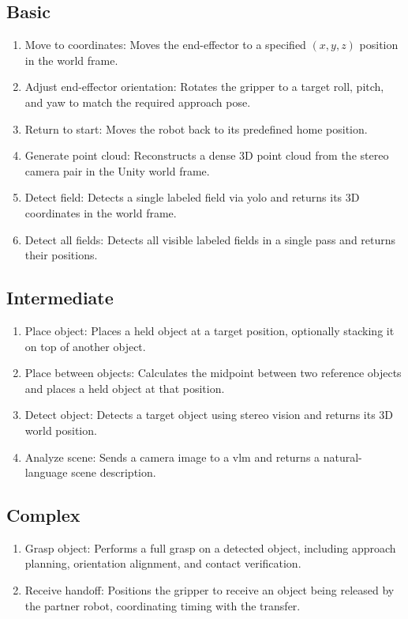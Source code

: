 \subsection{Basic}
\begin{enumerate}
	\item Move to coordinates: Moves the end-effector to a specified $(x, y, z)$ position in the world frame.
	\item Adjust end-effector orientation: Rotates the gripper to a target roll, pitch, and yaw to match the required approach pose.
	\item Return to start: Moves the robot back to its predefined home position.
	\item Generate point cloud: Reconstructs a dense 3D point cloud from the stereo camera pair in the Unity world frame.
	\item Detect field: Detects a single labeled field via \gls{yolo} and returns its 3D coordinates in the world frame.
	\item Detect all fields: Detects all visible labeled fields in a single pass and returns their positions.
\end{enumerate}

\subsection{Intermediate}
\begin{enumerate}
	\item Place object: Places a held object at a target position, optionally stacking it on top of another object.
	\item Place between objects: Calculates the midpoint between two reference objects and places a held object at that position.
	\item Detect object: Detects a target object using stereo vision and returns its 3D world position.
	\item Analyze scene: Sends a camera image to a \gls{vlm} and returns a natural-language scene description.
\end{enumerate}

\subsection{Complex}
\begin{enumerate}
	\item Grasp object: Performs a full grasp on a detected object, including approach planning, orientation alignment, and contact verification.
	\item Receive handoff: Positions the gripper to receive an object being released by the partner robot, coordinating timing with the transfer.
\end{enumerate}
